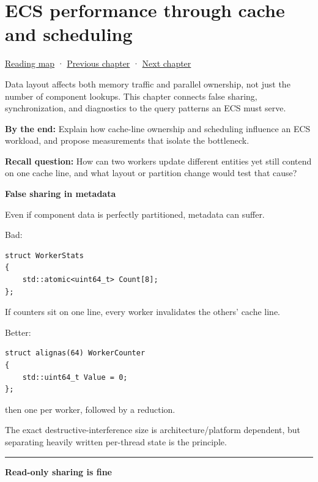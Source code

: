 \hypertarget{05-engine-i-ch017}{}
\chapter{ECS performance through cache and scheduling}\label{05-engine-i-ch017-ecs-performance-through-cache-and-scheduling}

\hyperref[volume-reading-map]{Reading map} · \hyperref[05-engine-i-ch016-archetypes-chunks-relationships-and-transforms]{Previous chapter} · \hyperref[05-engine-i-ch018-ecs-contracts-diagnostics-and-gpu-handoff]{Next chapter}

Data layout affects both memory traffic and parallel ownership, not just the number of component lookups. This chapter connects false sharing, synchronization, and diagnostics to the query patterns an ECS must serve.

\textbf{By the end:} Explain how cache-line ownership and scheduling influence an ECS workload, and propose measurements that isolate the bottleneck.

\textbf{Recall question:} How can two workers update different entities yet still contend on one cache line, and what layout or partition change would test that cause?

\textbf{False sharing in metadata}

Even if component data is perfectly partitioned, metadata can suffer.

Bad:

\begin{verbatim}
struct WorkerStats
{
    std::atomic<uint64_t> Count[8];
};
\end{verbatim}

If counters sit on one line, every worker invalidates the others' cache line.

Better:

\begin{verbatim}
struct alignas(64) WorkerCounter
{
    std::uint64_t Value = 0;
};
\end{verbatim}

then one per worker, followed by a reduction.

The exact destructive-interference size is architecture/platform dependent, but separating heavily written per-thread state is the principle.

\begin{center}\rule{0.5\linewidth}{0.5pt}\end{center}

\textbf{Read-only sharing is fine}

